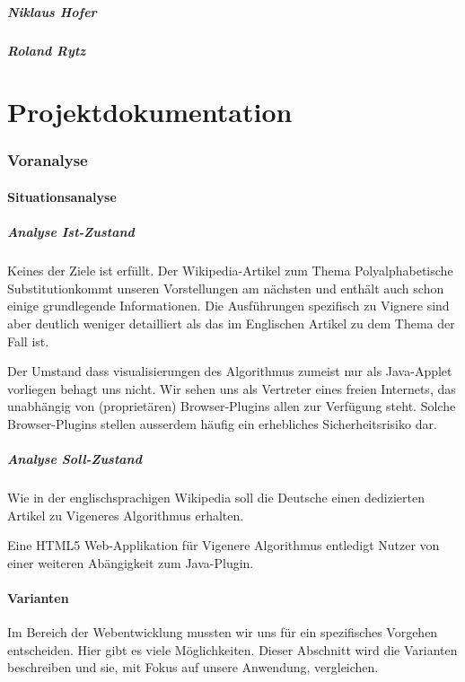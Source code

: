 \documentclass[11pt,paper=a4,final]{scrartcl}
\begin{document}
\subsubsection{Niklaus Hofer}
\subsubsection{Roland Rytz}
\part{Projektdokumentation}
\section{Voranalyse}
\subsection{Situationsanalyse}
\subsubsection{Analyse Ist-Zustand}
Keines der Ziele ist erf\"ullt. Der Wikipedia-Artikel zum Thema \glqq
Polyalphabetische Substitution\grqq kommt unseren Vorstellungen am n\"achsten
und enth\"alt auch schon einige grundlegende Informationen. Die Ausf\"uhrungen
spezifisch zu Vignere sind aber deutlich weniger detailliert als das im
Englischen Artikel zu dem Thema der Fall ist.

Der Umstand dass visualisierungen des Algorithmus zumeist nur als Java-Applet
vorliegen behagt uns nicht. Wir sehen uns als Vertreter eines \glqq freien\grqq
Internets, das unabh\"angig von (propriet\"aren) Browser-Plugins allen zur
Verf\"ugung steht. Solche Browser-Plugins stellen ausserdem h\"aufig ein
erhebliches Sicherheitsrisiko dar.
\subsubsection{Analyse Soll-Zustand}
Wie in der englischsprachigen Wikipedia soll die Deutsche einen dedizierten
Artikel zu Vigeneres Algorithmus erhalten.

Eine HTML5 Web-Applikation f\"ur Vigenere Algorithmus entledigt Nutzer von einer
weiteren Ab\"angigkeit zum Java-Plugin.
\subsection{Varianten}
Im Bereich der Webentwicklung mussten wir uns f\"ur ein spezifisches Vorgehen
entscheiden. Hier gibt es viele M\"oglichkeiten. Dieser Abschnitt wird die
Varianten beschreiben und sie, mit Fokus auf unsere Anwendung, vergleichen.
\end{document}

